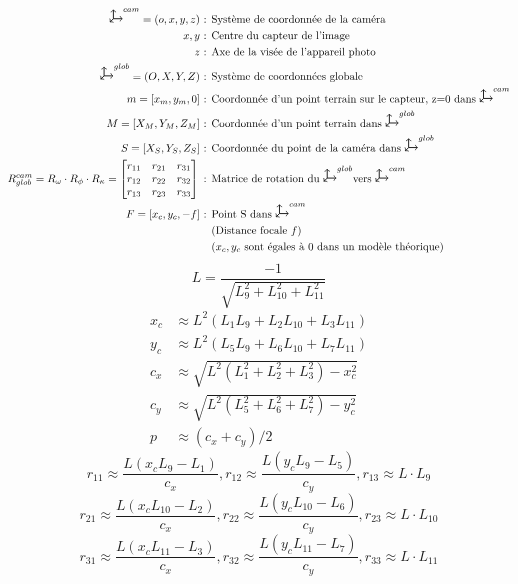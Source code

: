 \begin{align*}
    \descrVarEq{\scu^{cam}=(o,x,y,z)}{Système de coordonnée de la caméra}\\
    \descrVarEq{x,y}{Centre du capteur de l'image}\\
    \descrVarEq{z}{Axe de la visée de l'appareil photo}\\
    \descrVarEq{\scu^{glob}=(O,X,Y,Z)}{Système de coordonnées globale}\\
    \descrVarEq{m=[x_m,y_m,0]}{Coordonnée d'un point terrain sur le capteur, z=0 dans $\scu^{cam}$}\\
    \descrVarEq{M=[X_M,Y_M,Z_M]}{Coordonnée d'un point terrain dans $\scu^{glob}$}\\
    \descrVarEq{S=[X_S,Y_S,Z_S]}{Coordonnée du point de la caméra dans $\scu^{glob}$}\\
    R_{glob}^{cam}=R_\omega\cdot R_\phi\cdot R_\kappa=\begin{bmatrix}
    r_{11}&r_{21}&r_{31}\\
    r_{12}&r_{22}&r_{32}\\
    r_{13}&r_{23}&r_{33}
    \end{bmatrix}\textrm{ : }&\textrm{Matrice de rotation du $\scu^{glob}$vers $\scu^{cam}$}\\
    \descrVarEq{F=[x_c,y_c,-f]}{Point S dans $\scu^{cam}$}\\
    &\textrm{(Distance focale $f$)}\\
    &\textrm{($x_c,y_c$ sont égales à 0 dans un modèle théorique)}\\
\end{align*}
\begin{equation}
    \label{eq:transdlt}
    L=\frac{-1}{\sqrt{L^2_9+L^2_{10}+L^2_{11}}}
\end{equation} 
\begin{align*}
    x_c&\approx L^2(L_1L_9+L_2L_{10}+L_3L_{11})\\
    y_c&\approx L^2(L_5L_9+L_6L_{10}+L_7L_{11})\\
    c_x&\approx\sqrt{L^2(L^2_1+L^2_2+L^2_3)-x^2_c}\\
    c_y&\approx\sqrt{L^2(L^2_5+L^2_6+L^2_7)-y^2_c}\\
    p&\approx  (c_x+c_y)/2
\end{align*}
$$r_{11}\approx\frac{L(x_cL_9-L_1)}{c_x},r_{12}\approx\frac{L(y_cL_9-L_5)}{c_y},r_{13}\approx L\cdot L_9 $$
$$r_{21}\approx\frac{L(x_cL_{10}-L_2)}{c_x},r_{22}\approx\frac{L(y_cL_{10}-L_6)}{c_y},r_{23}\approx L\cdot L_{10} $$
$$r_{31}\approx\frac{L(x_cL_{11}-L_3)}{c_x},r_{32}\approx\frac{L(y_cL_{11}-L_7)}{c_y},r_{33}\approx L\cdot L_{11} $$
